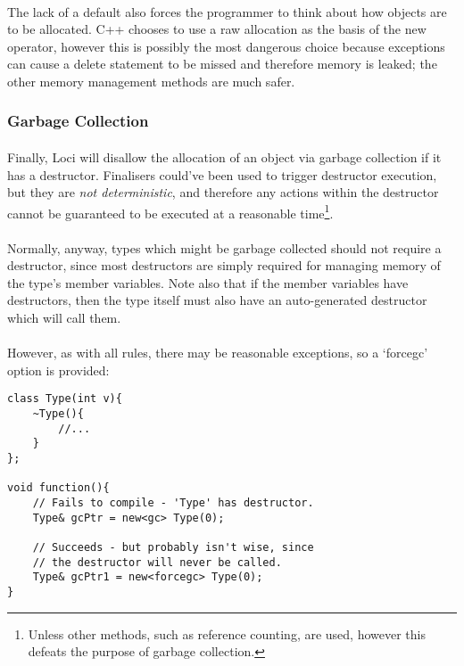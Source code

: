 \documentclass[12pt,twoside,notitlepage]{report}
\begin{document}
\paragraph{}
The lack of a default also forces the programmer to think about how objects are to be allocated. C++ chooses to use a raw allocation as the basis of the new operator, however this is possibly the most dangerous choice because exceptions can cause a delete statement to be missed and therefore memory is leaked; the other memory management methods are much safer.

\clearpage

\subsubsection{Garbage Collection}

\paragraph{}
Finally, Loci will disallow the allocation of an object via garbage collection if it has a destructor. Finalisers could've been used to trigger destructor execution, but they are \emph{not deterministic}, and therefore any actions within the destructor cannot be guaranteed to be executed at a reasonable time\footnote{Unless other methods, such as reference counting, are used, however this defeats the purpose of garbage collection.}.

\paragraph{}
Normally, anyway, types which might be garbage collected should not require a destructor, since most destructors are simply required for managing memory of the type's member variables. Note also that if the member variables have destructors, then the type itself must also have an auto-generated destructor which will call them.

\paragraph{}
However, as with all rules, there may be reasonable exceptions, so a `forcegc' option is provided:


\begin{lstlisting}
class Type(int v){
	~Type(){
		//...
	}
};

void function(){
	// Fails to compile - 'Type' has destructor.
	Type& gcPtr = new<gc> Type(0);
	
	// Succeeds - but probably isn't wise, since 
	// the destructor will never be called.
	Type& gcPtr1 = new<forcegc> Type(0);
}
\end{lstlisting}
\end{document}
